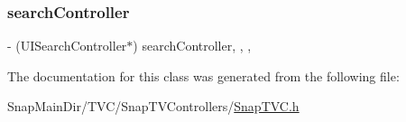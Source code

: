 \hypertarget{interface_snap_t_v_c_a3795ab183a886ed570b7dc849e93f1b0}{}\label{interface_snap_t_v_c_a3795ab183a886ed570b7dc849e93f1b0} 
\subsubsection{\texorpdfstring{search\+Controller}{searchController}}
{\footnotesize\ttfamily -\/ (U\+I\+Search\+Controller$\ast$) search\+Controller\hspace{0.3cm}{\ttfamily [read]}, {\ttfamily [write]}, {\ttfamily [nonatomic]}, {\ttfamily [strong]}}



The documentation for this class was generated from the following file\+:\begin{DoxyCompactItemize}
\item 
Snap\+Main\+Dir/\+T\+V\+C/\+Snap\+T\+V\+Controllers/\hyperlink{_snap_t_v_c_8h}{Snap\+T\+V\+C.\+h}\end{DoxyCompactItemize}
